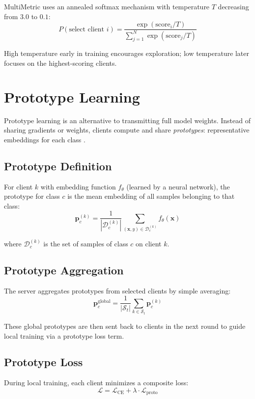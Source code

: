 MultiMetric uses an annealed softmax mechanism with temperature \(T\) decreasing from \(3.0\) to \(0.1\):
\[
P(\text{select client } i) = \frac{\exp(\text{score}_i / T)}{\sum_{j=1}^{N} \exp(\text{score}_j / T)}
\]

High temperature early in training encourages exploration; low temperature later focuses on the highest-scoring clients.

\section{Prototype Learning}

Prototype learning is an alternative to transmitting full model weights. Instead of sharing gradients or weights, clients compute and share \emph{prototypes}: representative embeddings for each class \citep{snell2017prototypical}.

\subsection{Prototype Definition}

For client \(k\) with embedding function \(f_\theta\) (learned by a neural network), the prototype for class \(c\) is the mean embedding of all samples belonging to that class:
\[
\mathbf{p}_c^{(k)} = \frac{1}{|\mathcal{D}_c^{(k)}|} \sum_{(\mathbf{x}, y) \in \mathcal{D}_c^{(k)}} f_\theta(\mathbf{x})
\]

where \(\mathcal{D}_c^{(k)}\) is the set of samples of class \(c\) on client \(k\).

\subsection{Prototype Aggregation}

The server aggregates prototypes from selected clients by simple averaging:
\[
\mathbf{p}_c^{\text{global}} = \frac{1}{|\mathcal{S}_t|} \sum_{k \in \mathcal{S}_t} \mathbf{p}_c^{(k)}
\]

These global prototypes are then sent back to clients in the next round to guide local training via a prototype loss term.

\subsection{Prototype Loss}

During local training, each client minimizes a composite loss:
\[
\mathcal{L} = \mathcal{L}_{\text{CE}} + \lambda \cdot \mathcal{L}_{\text{proto}}
\]

